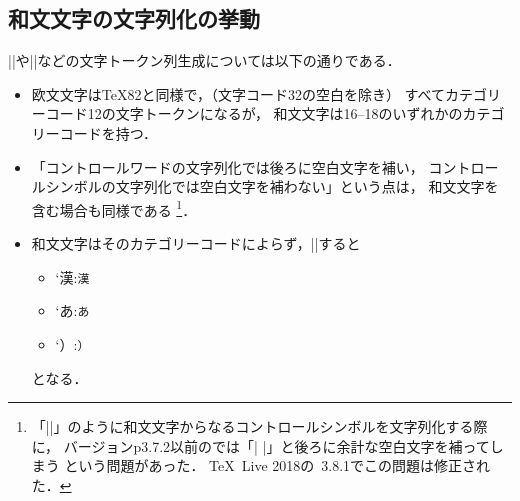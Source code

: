 \documentclass[a4paper,11pt,nomag,dvipdfmx]{jsarticle}
\begin{document}
\subsection{和文文字の文字列化の挙動}%
\label{sec:printkanji16bit}
|\string|や|\meaning|などの文字トークン列生成については以下の通りである．
\begin{itemize}
  \item 欧文文字は\TeX82と同様で，（文字コード32の空白を除き）
    すべてカテゴリーコード12の文字トークンになるが，
    和文文字は16--18のいずれかのカテゴリーコードを持つ．
  \item 「コントロールワードの文字列化では後ろに空白文字を補い，
    コントロールシンボルの文字列化では空白文字を補わない」という点は，
    和文文字を含む場合も同様である
    \footnote{「|\】|」のように和文文字からなるコントロールシンボルを文字列化する際に，
      バージョンp3.7.2以前の\pTeX では「|\】 |」と後ろに余計な空白文字を補ってしまう
      という問題があった．
      \TeX~Live 2018の\pTeX~3.8.1でこの問題は修正された\cite{tjb37}．}．
  \item 和文文字はそのカテゴリーコードによらず，|\meaning|すると
    \begin{itemize}%
      \item \the\kcatcode`漢:\quad \texttt{\meaning 漢}
      \item \the\kcatcode`あ:\quad \texttt{\meaning あ}
      \item \the\kcatcode`）:\quad \texttt{\meaning ）}
    \end{itemize}
    となる．
\end{itemize}
\end{document}
